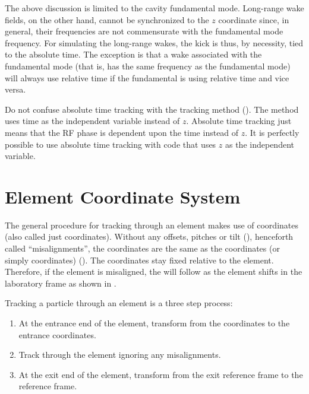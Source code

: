 The above discussion is limited to the cavity fundamental mode. Long-range wake fields, on the
other hand, cannot be synchronized to the $z$ coordinate since, in general, their frequencies are
not commensurate with the fundamental mode frequency. For simulating the long-range wakes, the kick
is thus, by necessity, tied to the absolute time. The exception is that a wake associated with the
fundamental mode (that is, has the same frequency as the fundamental mode) will always use relative
time if the fundamental is using relative time and vice versa.

Do not confuse absolute time tracking with the 
tracking method (). The  method uses
time as the independent variable instead of $z$. Absolute time
tracking just means that the RF phase is dependent upon the time
instead of $z$. It is perfectly possible to use absolute time
tracking with code that uses $z$ as the independent variable.

\section{Element Coordinate System}
\label{s:ele.coords}

The general procedure for tracking through an element makes use of
 coordinates (also called just 
coordinates). Without any offsets, pitches or tilt (), henceforth
called ``misalignments'', the  coordinates are the same
as the  coordinates (or simply 
coordinates) (). The  coordinates stay fixed
relative to the element. Therefore, if the element is misaligned, the
 will follow as the element shifts in the
laboratory frame as shown in .

Tracking a particle through an element is a three step process:
\begin{enumerate}
\item
At the entrance end of the element, transform from the 
coordinates to the entrance  coordinates.
\item
Track through the element ignoring any misalignments. 
\item
At the exit end of the element, transform from the exit 
reference frame to the  reference frame.
\end{enumerate}


